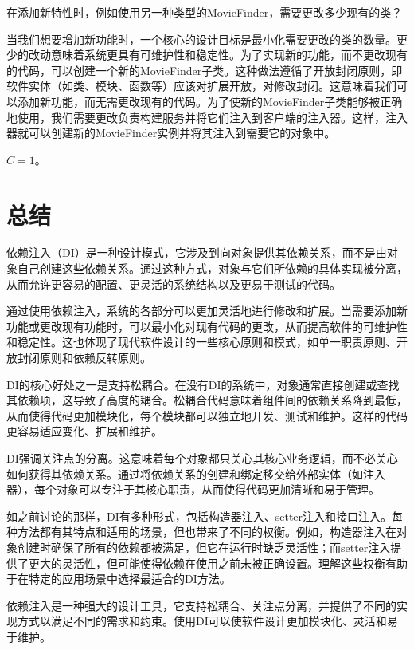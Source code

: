 在添加新特性时，例如使用另一种类型的MovieFinder，需要更改多少现有的类？

当我们想要增加新功能时，一个核心的设计目标是最小化需要更改的类的数量。更少的改动意味着系统更具有可维护性和稳定性。为了实现新的功能，而不更改现有的代码，可以创建一个新的MovieFinder子类。这种做法遵循了开放封闭原则，即软件实体（如类、模块、函数等）应该对扩展开放，对修改封闭。这意味着我们可以添加新功能，而无需更改现有的代码。为了使新的MovieFinder子类能够被正确地使用，我们需要更改负责构建服务并将它们注入到客户端的注入器。这样，注入器就可以创建新的MovieFinder实例并将其注入到需要它的对象中。

$C = 1$。
\section{总结}
依赖注入（DI）是一种设计模式，它涉及到向对象提供其依赖关系，而不是由对象自己创建这些依赖关系。通过这种方式，对象与它们所依赖的具体实现被分离，从而允许更容易的配置、更灵活的系统结构以及更易于测试的代码。

通过使用依赖注入，系统的各部分可以更加灵活地进行修改和扩展。当需要添加新功能或更改现有功能时，可以最小化对现有代码的更改，从而提高软件的可维护性和稳定性。这也体现了现代软件设计的一些核心原则和模式，如单一职责原则、开放封闭原则和依赖反转原则。

DI的核心好处之一是支持松耦合。在没有DI的系统中，对象通常直接创建或查找其依赖项，这导致了高度的耦合。松耦合代码意味着组件间的依赖关系降到最低，从而使得代码更加模块化，每个模块都可以独立地开发、测试和维护。这样的代码更容易适应变化、扩展和维护。

DI强调关注点的分离。这意味着每个对象都只关心其核心业务逻辑，而不必关心如何获得其依赖关系。通过将依赖关系的创建和绑定移交给外部实体（如注入器），每个对象可以专注于其核心职责，从而使得代码更加清晰和易于管理。

如之前讨论的那样，DI有多种形式，包括构造器注入、setter注入和接口注入。每种方法都有其特点和适用的场景，但也带来了不同的权衡。例如，构造器注入在对象创建时确保了所有的依赖都被满足，但它在运行时缺乏灵活性；而setter注入提供了更大的灵活性，但可能使得依赖在使用之前未被正确设置。理解这些权衡有助于在特定的应用场景中选择最适合的DI方法。

依赖注入是一种强大的设计工具，它支持松耦合、关注点分离，并提供了不同的实现方式以满足不同的需求和约束。使用DI可以使软件设计更加模块化、灵活和易于维护。
